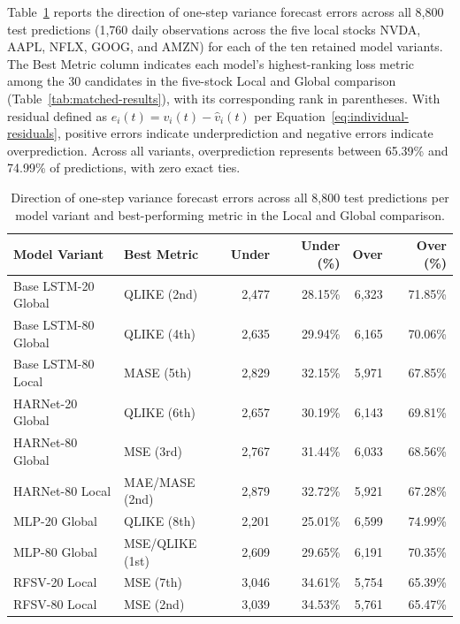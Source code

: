 \documentclass[12pt,a4paper]{article}
\numberwithin{equation}{section}
\numberwithin{table}{section}
\numberwithin{figure}{section}
\begin{document}
Table~\ref{tab:residual-prediction-bias} reports the direction of one-step variance forecast errors across all 8,800 test predictions (1,760 daily observations across the five local stocks NVDA, AAPL, NFLX, GOOG, and AMZN) for each of the ten retained model variants. The Best Metric column indicates each model's highest-ranking loss metric among the 30 candidates in the five-stock Local and Global comparison (Table~\ref{tab:matched-results}), with its corresponding rank in parentheses. With residual defined as $e_i(t)=v_i(t)-\widehat v_i(t)$ per Equation~\eqref{eq:individual-residuals}, positive errors indicate underprediction and negative errors indicate overprediction. Across all variants, overprediction represents between 65.39\% and 74.99\% of predictions, with zero exact ties.

\begin{table}[htbp]
\centering\small\setlength{\tabcolsep}{3pt}
\begin{tabular}{llrrrr}
\hline
Model Variant & Best Metric & Under & Under (\%) & Over & Over (\%) \\
\hline
  Base LSTM-20 Global & QLIKE (2nd) & 2,477 & 28.15\% & 6,323 & 71.85\% \\
  Base LSTM-80 Global & QLIKE (4th) & 2,635 & 29.94\% & 6,165 & 70.06\% \\
  Base LSTM-80 Local & MASE (5th) & 2,829 & 32.15\% & 5,971 & 67.85\% \\
  HARNet-20 Global & QLIKE (6th) & 2,657 & 30.19\% & 6,143 & 69.81\% \\
  HARNet-80 Global & MSE (3rd) & 2,767 & 31.44\% & 6,033 & 68.56\% \\
  HARNet-80 Local & MAE/MASE (2nd) & 2,879 & 32.72\% & 5,921 & 67.28\% \\
  MLP-20 Global & QLIKE (8th) & 2,201 & 25.01\% & 6,599 & 74.99\% \\
  MLP-80 Global & MSE/QLIKE (1st) & 2,609 & 29.65\% & 6,191 & 70.35\% \\
  RFSV-20 Local & MSE (7th) & 3,046 & 34.61\% & 5,754 & 65.39\% \\
  RFSV-80 Local & MSE (2nd) & 3,039 & 34.53\% & 5,761 & 65.47\% \\
\hline
\end{tabular}
\caption{Direction of one-step variance forecast errors across all 8,800 test predictions per model variant and best-performing metric in the Local and Global comparison.}
\label{tab:residual-prediction-bias}
\end{table}
\FloatBarrier
\end{document}
